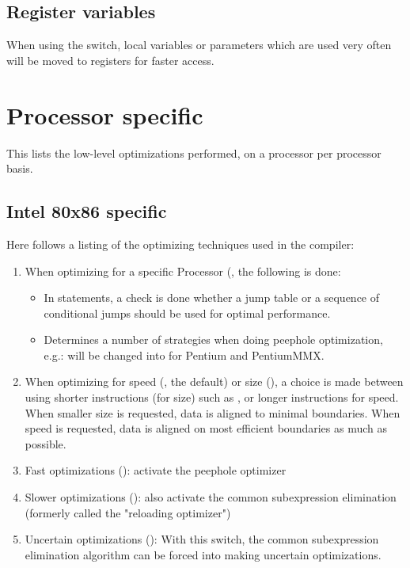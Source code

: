 {\subsection{Register variables}

When using the  switch, local variables or parameters
which are used very often will be moved to registers for faster
access.

\section{Processor specific}

This lists the low-level optimizations performed, on a processor
per processor basis.

\subsection{Intel 80x86 specific}

Here follows a listing of the optimizing techniques used in the compiler:
\begin{enumerate}
\item When optimizing for a specific Processor (,
the following is done:
\begin{itemize}
\item In  statements, a check is done whether a jump table
or a sequence of conditional jumps should be used for optimal performance.
\item Determines a number of strategies when doing peephole optimization, e.g.:
 will be changed into
 for Pentium and PentiumMMX.
\end{itemize}
\item When optimizing for speed (, the default) or size (), a choice is
made between using shorter instructions (for size) such as ,
or longer instructions  for speed. When smaller size is
requested, data is aligned to minimal boundaries.  When speed is
requested, data is aligned on most efficient boundaries as much as possible.
\item Fast optimizations (): activate the peephole optimizer
\item Slower optimizations (): also activate the common subexpression
elimination (formerly called the "reloading optimizer")
\item Uncertain optimizations (): With this switch, the common subexpression
elimination algorithm can be forced into making uncertain optimizations.


\end{enumerate}}
